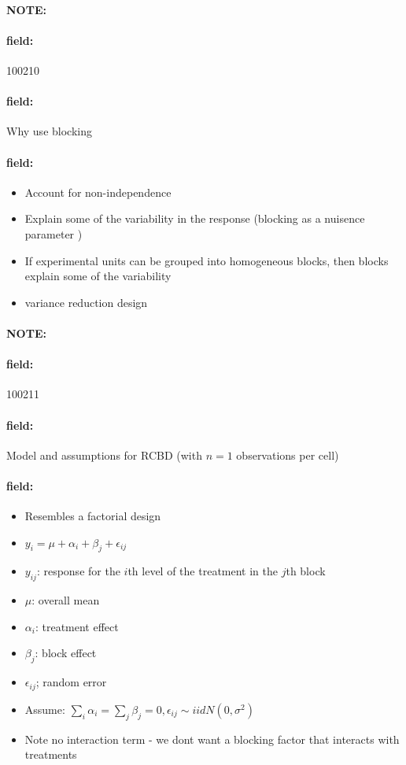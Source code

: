 \documentclass[12pt]{article}
\newenvironment{note}{\paragraph{NOTE:}}{}
\newenvironment{field}{\paragraph{field:}}{}
\begin{document}
\begin{note}
    \begin{field}
        \tiny 100210
    \end{field}
    \begin{field}
        Why use blocking
    \end{field}
    \begin{field}
        \begin{itemize}
          \item Account for non-independence
          \item Explain some of the variability in the response (blocking as a nuisence parameter )
          \item If experimental units can be grouped into homogeneous blocks, then blocks explain some of the variability
          \item variance reduction design
        \end{itemize}
    \end{field}
\end{note}



\begin{note}
    \begin{field}
        \tiny 100211
    \end{field}
    \begin{field}
        Model and assumptions for RCBD (with $n=1$ observations per cell)
    \end{field}
    \begin{field}
        \begin{itemize}
          \item Resembles a factorial design
          \item $y_i = \mu + \alpha_i + \beta_j + \epsilon_{ij}$
          \item $y_{ij}$: response for the $i$th level of the treatment in the $j$th block
          \item $\mu$: overall mean
          \item $\alpha_i$: treatment effect
          \item $\beta_j$: block effect
          \item $\epsilon_{ij}$; random error
          \item Assume: $\sum_i \alpha_i = \sum_j\beta_j = 0, \epsilon_{ij} \sim iid N(0,\sigma^2)$
          \item Note no interaction term - we dont want a blocking factor that interacts with treatments
        \end{itemize}
    \end{field}
\end{note}
\end{document}
